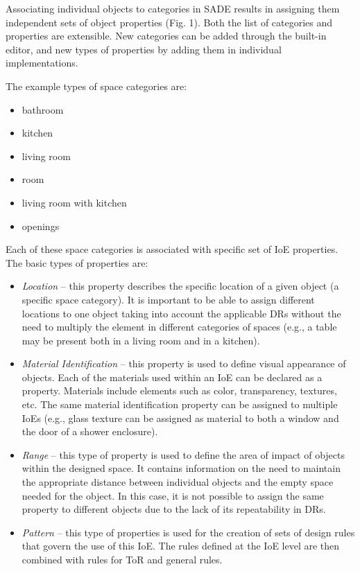 \documentclass[runningheads]{llncs}
\begin{document}
Associating individual objects to categories in SADE results in assigning them independent sets of object properties (Fig. 1). Both the list of categories and properties are extensible. New categories can be added through the built-in editor, and new types of properties by adding them in individual implementations.

The example types of space categories are:
\begin{itemize}
\item bathroom
\item kitchen
\item living room
\item room
\item living room with kitchen
\item openings
\end{itemize}

Each of these space categories is associated with specific set of IoE properties. The basic types of properties are:
\begin{itemize}
\item \emph{Location} -- this property describes the specific location of a given object (a specific space category). It is important to be able to assign different locations to one object taking into account the applicable DRs without the need to multiply the element in different categories of spaces (e.g., a table may be present both in a living room and in a kitchen).\\
\item \emph{Material Identification} -- this property is used to define visual appearance of objects. Each of the materials used within an IoE can be declared as a property. Materials include elements such as color, transparency, textures, etc. The same material identification property can be assigned to multiple IoEs (e.g., glass texture can be assigned as material to both a window and the door of a shower enclosure).\\
\item \emph{Range} -- this type of property is used to define the area of impact of objects within the designed space. It contains information on the need to maintain the appropriate distance between individual objects and the empty space needed for the object. In this case, it is not possible to assign the same property to different objects due to the lack of its repeatability in DRs.\\
\item \emph{Pattern} -- this type of properties is used for the creation of sets of design rules that govern the use of this IoE. The rules defined at the IoE level are then combined with rules for ToR and general rules. 
\end{itemize}
\end{document}

